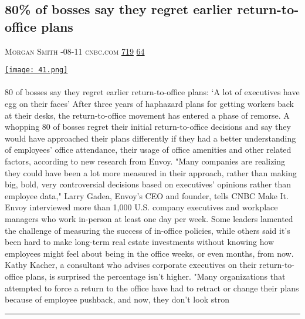 \documentclass[10pt,a4paper]{article}
\begin{document}
\begin{multicols*}{2}

\noindent\begin{minipage}{\linewidth}
\subsection{80\% of bosses say they regret earlier return-to-office plans}
\textsc{\footnotesize
{\scriptsize\faUser}\space 
Morgan Smith 
{\scriptsize\faCalendar}-08-11 
{\scriptsize\faGlobe}\space 
cnbc.com 
{\scriptsize\faThumbsOUp}\space 
\href{http://news.ycombinator.com/item?id=37093854\&utm\_term=comment}{719} 
{\scriptsize\faComments}\space 
\href{http://news.ycombinator.com/item?id=37093854\&utm\_term=comment}{64} 
}
\par\medskip\noindent
\href{https://www.cnbc.com/2023/08/11/80percent-of-bosses-say-they-regret-earlier-return-to-office-plans.html?utm\_source=hackernewsletter\&utm\_medium=email\&utm\_term=working}{
    \texttt{[image: 41.png]}
}
\end{minipage}
\paragraph{}
80 of bosses say they regret earlier return-to-office plans: ‘A lot of executives have egg on their faces’
After three years of haphazard plans for getting workers back at their desks, the return-to-office movement has entered a phase of remorse.
A whopping 80 of bosses regret their initial return-to-office decisions and say they would have approached their plans differently if they had a better understanding of employees' office attendance, their usage of office amenities and other related factors, according to new research from Envoy.
"Many companies are realizing they could have been a lot more measured in their approach, rather than making big, bold, very controversial decisions based on executives' opinions rather than employee data," Larry Gadea, Envoy's CEO and founder, tells CNBC Make It.
Envoy interviewed more than 1,000 U.S. company executives and workplace managers who work in-person at least one day per week.
Some leaders lamented the challenge of measuring the success of in-office policies, while others said it's been hard to make long-term real estate investments without knowing how employees might feel about being in the office weeks, or even months, from now.
Kathy Kacher, a consultant who advises corporate executives on their return-to-office plans, is surprised the percentage isn't higher.
"Many organizations that attempted to force a return to the office have had to retract or change their plans because of employee pushback, and now, they don't look stron
\par\noindent\textcolor{red}{\rule{\linewidth}{0.2mm}}
\vfill
\null
\noindent\begin{minipage}{\linewidth}

\end{minipage}
\end{multicols*}
\end{document}
